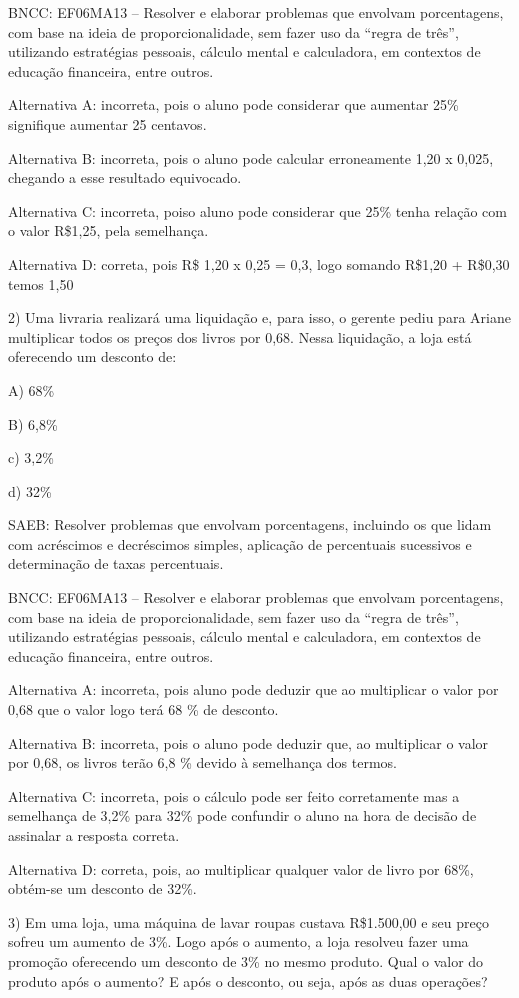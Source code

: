 BNCC: EF06MA13 -- Resolver e elaborar problemas que envolvam
porcentagens, com base na ideia de proporcionalidade, sem fazer uso da
``regra de três'', utilizando estratégias pessoais, cálculo mental e
calculadora, em contextos de educação financeira, entre outros.

Alternativa A: incorreta, pois o aluno pode considerar que aumentar 25\%
signifique aumentar 25 centavos.

Alternativa B: incorreta, pois o aluno pode calcular erroneamente 1,20 x
0,025, chegando a esse resultado equivocado.

Alternativa C: incorreta, poiso aluno pode considerar que 25\% tenha
relação com o valor R\$1,25, pela semelhança.

Alternativa D: correta, pois R\$ 1,20 x 0,25 = 0,3, logo somando R\$1,20
+ R\$0,30 temos 1,50

2) Uma livraria realizará uma liquidação e, para isso, o gerente pediu
para Ariane multiplicar todos os preços dos livros por 0,68. Nessa
liquidação, a loja está oferecendo um desconto de:

A) 68\%

B) 6,8\%

c) 3,2\%

d) 32\%

SAEB: Resolver problemas que envolvam porcentagens, incluindo os que
lidam com acréscimos e decréscimos simples, aplicação de percentuais
sucessivos e determinação de taxas percentuais.

BNCC: EF06MA13 -- Resolver e elaborar problemas que envolvam
porcentagens, com base na ideia de proporcionalidade, sem fazer uso da
``regra de três'', utilizando estratégias pessoais, cálculo mental e
calculadora, em contextos de educação financeira, entre outros.

Alternativa A: incorreta, pois aluno pode deduzir que ao multiplicar o
valor por 0,68 que o valor logo terá 68 \% de desconto.

Alternativa B: incorreta, pois o aluno pode deduzir que, ao multiplicar
o valor por 0,68, os livros terão 6,8 \% devido à semelhança dos termos.

Alternativa C: incorreta, pois o cálculo pode ser feito corretamente mas
a semelhança de 3,2\% para 32\% pode confundir o aluno na hora de
decisão de assinalar a resposta correta.

Alternativa D: correta, pois, ao multiplicar qualquer valor de livro por
68\%, obtém-se um desconto de 32\%.

3) Em uma loja, uma máquina de lavar roupas custava R\$1.500,00 e seu
preço sofreu um aumento de 3\%. Logo após o aumento, a loja resolveu
fazer uma promoção oferecendo um desconto de 3\% no mesmo produto. Qual
o valor do produto após o aumento? E após o desconto, ou seja, após as
duas operações?

